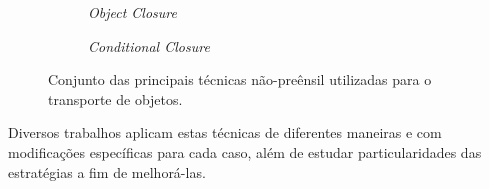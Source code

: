\begin{figure}[htpb]
  \vspace{0.3cm}
  \begin{subfigure}[t]{0.45\textwidth}
    \centering
    \caption{\emph{Object Closure}}
  \end{subfigure}
  \hspace{0.2cm}
  \begin{subfigure}[t]{0.45\textwidth}
    \centering
    \caption{\emph{Conditional Closure}}
  \end{subfigure}

  \caption{Conjunto das principais técnicas não-preênsil utilizadas para o transporte de objetos.}
  \label{fig:non_preensile_methods}
\end{figure}

Diversos trabalhos aplicam estas técnicas de diferentes maneiras e com modificações específicas para cada caso, além de estudar particularidades das estratégias a fim de melhorá-las.

